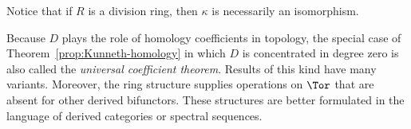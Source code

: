 Notice that if $R$ is a division ring, then $\kappa$ is necessarily an
isomorphism.

Because $D$ plays the role of homology coefficients in topology, the special
case of Theorem~\ref{prop:Kunneth-homology} in which $D$ is concentrated in
degree zero is also called the \emph{universal coefficient theorem}. Results
of this kind have many variants. Moreover, the ring structure supplies
operations on $\Tor$ that are absent for other derived bifunctors. These
structures are better formulated in the language of derived categories or
spectral sequences.
